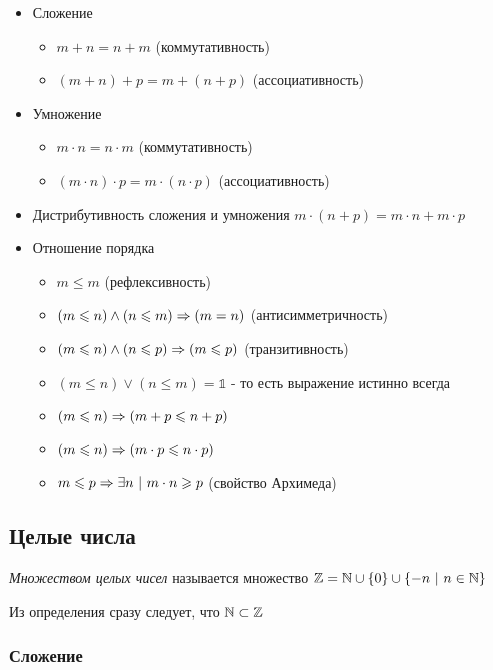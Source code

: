 \begin{itemize}
    \item Сложение
    \begin{itemize}
        \item $m + n = n + m$ (коммутативность)
        \item $(m + n) + p = m + (n + p)$ (ассоциативность)
    \end{itemize}
    \item Умножение
    \begin{itemize}
        \item $m \cdot n = n \cdot m$ (коммутативность)
        \item $(m \cdot n) \cdot p = m \cdot (n \cdot p)$ (ассоциативность)
    \end{itemize}
    \item Дистрибутивность сложения и умножения
    $m \cdot (n + p) = m \cdot n + m \cdot p$
    \item Отношение порядка
    \begin{itemize}
        \item $m \le m$ (рефлексивность)
        \item $(m \leqslant n) \wedge (n \leqslant m) \Rightarrow (m = n)$ (антисимметричность)
        \item $(m \leqslant n) \wedge (n \leqslant p) \Rightarrow (m \leqslant p)$ (транзитивность)
        \item $(m \le n) \vee (n \le m) = \mathbb{1}$ - то есть выражение истинно всегда
        \item $(m \leqslant n) \Rightarrow (m + p \leqslant n + p)$
        \item $(m \leqslant n) \Rightarrow (m \cdot p \leqslant n \cdot p)$
        \item $m \leqslant p \Rightarrow \exists n\ |\ m \cdot n \geqslant p$ (свойство Архимеда)
    \end{itemize}
\end{itemize}


\subsection{Целые числа}

\begin{definition}
    \textit{Множеством целых чисел} называется множество $\mathbb{Z} = \mathbb{N} \cup \{0\} \cup \{-n\ |\ n \in \mathbb{N}\}$
\end{definition}

Из определения сразу следует, что $\mathbb{N} \subset \mathbb{Z}$

\subsubsection{Сложение}

